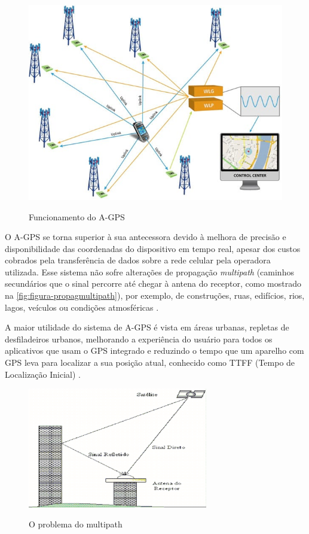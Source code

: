 \begin{figure}[H]
    \centering
    \caption{Funcionamento do A-GPS}
    \includegraphics[width=1.0\textwidth]{./dados/figuras/fig2}
    \label{fig:figura-funcagps}
\end{figure}

O A-GPS se torna superior à sua antecessora devido à melhora de precisão e disponibilidade das coordenadas do dispositivo em tempo real, apesar dos custos cobrados pela transferência de dados sobre a rede celular pela operadora utilizada. Esse sistema não sofre alterações de propagação \textit{multipath} (caminhos secundários que o sinal percorre até chegar à antena do receptor, como mostrado na \autoref{fig:figura-propagmultipath}), por exemplo, de construções, ruas, edifícios, rios, lagos, veículos ou condições atmosféricas \cite{oficinanetagps:2018} \cite{multicaminho:2004}.

 A maior utilidade do sistema de A-GPS é vista em áreas urbanas, repletas de desfiladeiros urbanos, melhorando a experiência do usuário para todos os aplicativos que usam o GPS integrado e reduzindo o tempo que um aparelho com GPS leva para localizar a sua posição atual, conhecido como TTFF (Tempo de Localização Inicial) \cite{oficinanetagps:2018}.

\begin{figure}[H]
    \centering
    \caption{O problema do multipath}
    \includegraphics[width=0.7\textwidth]{./dados/figuras/fig3}
    \label{fig:figura-propagmultipath}
\end{figure}

